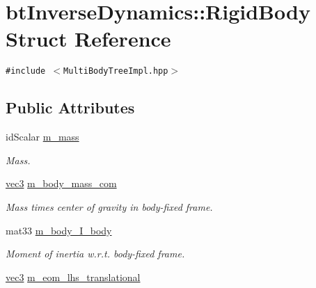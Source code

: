 \hypertarget{structbt_inverse_dynamics_1_1_rigid_body}{
\section{btInverseDynamics::RigidBody Struct Reference}
\label{structbt_inverse_dynamics_1_1_rigid_body}
}
{\tt \#include $<$MultiBodyTreeImpl.hpp$>$}

\subsection*{Public Attributes}
\begin{CompactItemize}
\item 
\hypertarget{structbt_inverse_dynamics_1_1_rigid_body_9c2c26d13a5bfceeb1c936830ef98d75}{
idScalar \hyperlink{structbt_inverse_dynamics_1_1_rigid_body_9c2c26d13a5bfceeb1c936830ef98d75}{m\_\-mass}}
\label{structbt_inverse_dynamics_1_1_rigid_body_9c2c26d13a5bfceeb1c936830ef98d75}

\begin{CompactList}\small\item\em Mass. \item\end{CompactList}\item 
\hypertarget{structbt_inverse_dynamics_1_1_rigid_body_0fec2613f8d67563ae5450af75558832}{
\hyperlink{classbt_inverse_dynamics_1_1vec3}{vec3} \hyperlink{structbt_inverse_dynamics_1_1_rigid_body_0fec2613f8d67563ae5450af75558832}{m\_\-body\_\-mass\_\-com}}
\label{structbt_inverse_dynamics_1_1_rigid_body_0fec2613f8d67563ae5450af75558832}

\begin{CompactList}\small\item\em Mass times center of gravity in body-fixed frame. \item\end{CompactList}\item 
\hypertarget{structbt_inverse_dynamics_1_1_rigid_body_dc6f5a9cc20ea241416a56839010c461}{
mat33 \hyperlink{structbt_inverse_dynamics_1_1_rigid_body_dc6f5a9cc20ea241416a56839010c461}{m\_\-body\_\-I\_\-body}}
\label{structbt_inverse_dynamics_1_1_rigid_body_dc6f5a9cc20ea241416a56839010c461}

\begin{CompactList}\small\item\em Moment of inertia w.r.t. body-fixed frame. \item\end{CompactList}\item 
\hypertarget{structbt_inverse_dynamics_1_1_rigid_body_ba23569b6f1234b68eaaa8adc9bdbdd6}{
\hyperlink{classbt_inverse_dynamics_1_1vec3}{vec3} \hyperlink{structbt_inverse_dynamics_1_1_rigid_body_ba23569b6f1234b68eaaa8adc9bdbdd6}{m\_\-eom\_\-lhs\_\-translational}}
\label{structbt_inverse_dynamics_1_1_rigid_body_ba23569b6f1234b68eaaa8adc9bdbdd6}


\end{CompactItemize}
